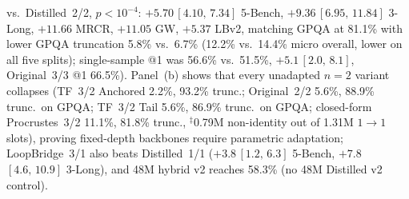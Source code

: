 \documentclass[11pt]{article}
\newcommand{\ci}[2]{\,{\scriptsize\ensuremath{[#1,\,#2]}}}
\begin{document}
\begin{table}[t]
{vs.\ Distilled~2/2, $p{<}10^{-4}$: $+5.70$\ci{4.10}{7.34} 5-Bench, $+9.36$\ci{6.95}{11.84} 3-Long, $+11.66$ MRCR,
$+11.05$ GW, $+5.37$ LBv2, matching GPQA at 81.1\% with lower GPQA truncation 5.8\% vs.\ 6.7\% (12.2\% vs.\ 14.4\%
micro overall, lower on all five splits); single-sample @1 was
56.6\% vs.\ 51.5\%, $+5.1$\ci{2.0}{8.1}, Original~3/3 @1 66.5\%).
Panel~(b) shows that every unadapted $n{=}2$ variant collapses (TF~3/2 Anchored 2.2\%, 93.2\% trunc.; Original~2/2
5.6\%, 88.9\% trunc.\ on GPQA; TF~3/2 Tail 5.6\%, 86.9\% trunc.\ on GPQA; closed-form Procrustes~3/2 11.1\%, 81.8\%
trunc., $^\ddagger$0.79M non-identity out of 1.31M $1{\to}1$ slots), proving fixed-depth backbones require parametric
adaptation; LoopBridge~3/1 also beats Distilled~1/1 ($+3.8$\ci{1.2}{6.3} 5-Bench, $+7.8$\ci{4.6}{10.9} 3-Long), and
48M hybrid v2 reaches 58.3\% (no 48M Distilled v2 control).}
\label{tab:mini}
\end{table}
\end{document}
